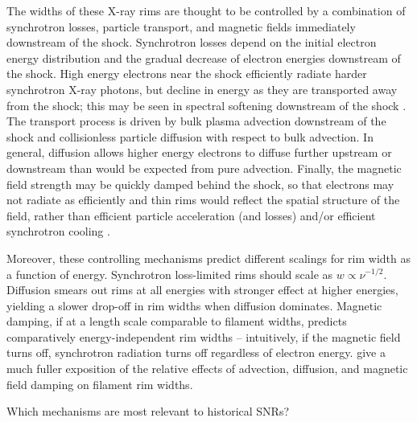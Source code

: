 \documentclass[iop, apj, numberedappendix, twocolappendix]{emulateapj}
\begin{document}
The widths of these X-ray rims are thought to be controlled by a combination of
synchrotron losses, particle transport, and magnetic fields immediately
downstream of the shock.  Synchrotron losses depend on the initial electron
energy distribution and the gradual decrease of electron energies downstream of
the shock.  High energy electrons near the shock efficiently radiate harder
synchrotron X-ray photons, but decline in energy as they are transported away
from the shock; this may be seen in spectral softening downstream of the shock
\citep[e.g.,][]{cassam-chenai2007}.  The transport process is driven by bulk
plasma advection downstream of the shock and collisionless particle diffusion
 with respect to
bulk advection.  In general, diffusion allows higher energy electrons to
diffuse further upstream or downstream than would be expected from pure
advection.  Finally, the magnetic field strength may be quickly damped behind
the shock, so that electrons may not radiate as efficiently and thin rims would
reflect the spatial structure of the field, rather than efficient particle
acceleration (and losses) and/or efficient synchrotron cooling
\citep{pohl2005}.

Moreover, these controlling mechanisms predict different scalings for rim width
as a function of energy.  Synchrotron loss-limited rims should scale as $w
\propto \nu^{-1/2}$.  Diffusion smears out rims at all energies with stronger
effect at higher energies, yielding a slower drop-off in rim widths when
diffusion dominates.  Magnetic damping, if at a length scale comparable to
filament widths, predicts comparatively energy-independent rim widths --
intuitively, if the magnetic field turns off, synchrotron radiation turns off
regardless of electron energy.  \citet{ressler2014}
give a much fuller exposition of the relative effects of advection, diffusion,
and magnetic field damping on filament rim widths.

Which mechanisms are most relevant to historical SNRs?
\end{document}
